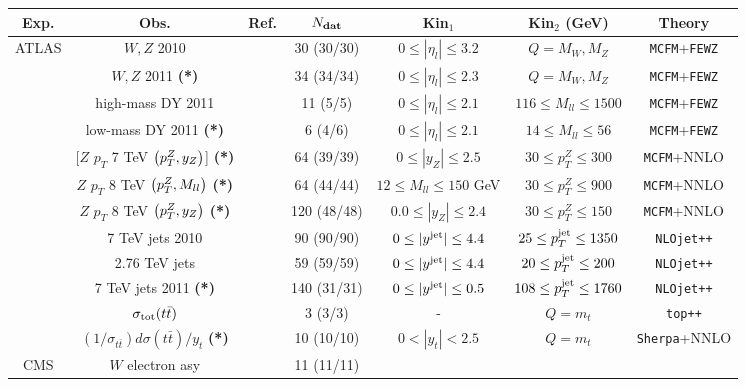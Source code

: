 \begin{table}[ht]
\scriptsize
\begin{centering}
   \renewcommand{\arraystretch}{1.4}
\begin{tabular}{|c|c|c|c|c|c|c|}
  \hline
  {Exp.} & Obs. & {Ref.}  & $ N_{\rm \bf dat}$  & Kin$_1$  &  Kin$_2$ (GeV) & Theory \tabularnewline
\hline
\hline
\multirow{12}{*}{ATLAS} &   $W,Z$ 2010 & \cite{Aad:2011dm}  &  30 (30/30) & $ 0 \le |\eta_l| \le 3.2$ & $Q=M_W, M_Z$ &
{\tt MCFM}+{\tt FEWZ}\tabularnewline
&   $W,Z$ 2011 {\bf (*)}  & \cite{Aaboud:2016btc}  & 34 (34/34)   & $0 \le |\eta_l| \le 2.3$   & $Q=M_W, M_Z$ &
{\tt MCFM}+{\tt FEWZ}\tabularnewline
&    high-mass DY 2011 & \cite{Aad:2013iua}  & 11 (5/5) & $0 \le |\eta_l| \le 2.1$ & $ 116 \le M_{ll} \le 1500$  &
{\tt MCFM}+{\tt FEWZ} \tabularnewline
&    low-mass DY 2011 {\bf (*)}   & \cite{Aad:2014qja}  & 6 (4/6)  & $0 \le  |\eta_l| \le 2.1$  & $  14 \le M_{ll} \le 56  $  &
{\tt MCFM}+{\tt FEWZ}
\tabularnewline
&    [$Z$ $p_T$ 7 TeV $\left( p_T^Z,y_Z\right)$]  {\bf (*)}  & \cite{Aad:2014xaa}  & 64 (39/39)  &
$0 \le |y_{Z}| \le 2.5$  &  $30 \le p_T^Z \le 300$   & {\tt MCFM}+NNLO
\tabularnewline
&    $Z$ $p_T$ 8 TeV $\left( p_T^Z,M_{ll}\right)$  {\bf (*)}  & \cite{Aad:2015auj}  & 64 (44/44)  &  $  12 \le M_{ll} \le
150 $  GeV & $30 \le p_T^Z \le 900$  & {\tt MCFM}+NNLO
      \tabularnewline
      &    $Z$ $p_T$ 8 TeV $\left( p_T^Z,y_Z\right)$  {\bf (*)}  & \cite{Aad:2015auj}  & 120 (48/48)  & $   0.0\le |y_{Z}| \le 2.4  $  
        & $   30\le p_{T}^Z \le 150  $  &
          {\tt MCFM}+NNLO
            \tabularnewline
&    7 TeV jets 2010 & \cite{Aad:2011fc}  & 90 (90/90) &
$0 \le |y^{\rm jet}| \le 4.4 $ & $ 25 \le p_T^{\rm jet} \le 1350 $&
{\tt NLOjet++}
\tabularnewline
&      2.76 TeV jets  &  \cite{Aad:2013lpa}  &
59 (59/59) & $0 \le |y^{\rm jet}| \le 4.4$ & $20 \le p_T^{\rm jet} \le 200$ & {\tt NLOjet++}
\tabularnewline
&      7 TeV jets 2011 {\bf (*)}  &  \cite{Aad:2014vwa}  & 140 (31/31)
  & $ 0 \le |y^{\rm jet}| \le 0.5  $ & $108 \le p_T^{\rm jet} \le 1760 $ & {\tt NLOjet++}
\tabularnewline
  &    $\sigma_{\rm tot}(t\bar{t})$  & \cite{Aad:2014kva,Aaboud:2016pbd}& 
3 (3/3) & - & $Q=m_t$ & {\tt top++} \tabularnewline
 &    $(1/\sigma_{t\bar{t}})d\sigma(t\bar{t})/y_t$  {\bf (*)}   & \cite{Aad:2015mbv}& 
10 (10/10)  & $0<|y_t|<2.5$ & $Q=m_t$ & {\tt Sherpa}+NNLO \tabularnewline
 \hline
 \hline
\multirow{12}{*}{CMS} &   $W$ electron asy & \cite{Chatrchyan:2012xt}  &  11 (11/11) &

\end{tabular}
\end{centering}
\end{table}
